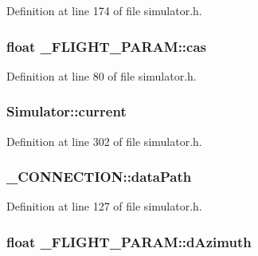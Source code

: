 \-Definition at line 174 of file simulator.\-h.

\hypertarget{group___h_i_t_l_plugin_ga2fbe36224e421144a3822791ccd78c7b}{
\subsubsection[{cas}]{\setlength{\rightskip}{0pt plus 5cm}float {\bf \-\_\-\-F\-L\-I\-G\-H\-T\-\_\-\-P\-A\-R\-A\-M\-::cas}}}\label{group___h_i_t_l_plugin_ga2fbe36224e421144a3822791ccd78c7b}


\-Definition at line 80 of file simulator.\-h.

\hypertarget{group___h_i_t_l_plugin_gaa4ad7484ddab07936a31a63fab4be22e}{
\subsubsection[{current}]{ {\bf \-Simulator\-::current}}}\label{group___h_i_t_l_plugin_gaa4ad7484ddab07936a31a63fab4be22e}


\-Definition at line 302 of file simulator.\-h.

\hypertarget{group___h_i_t_l_plugin_ga4505c573ba399fc3e915fec6842c3bcb}{
\subsubsection[{data\-Path}]{ {\bf \-\_\-\-C\-O\-N\-N\-E\-C\-T\-I\-O\-N\-::data\-Path}}}\label{group___h_i_t_l_plugin_ga4505c573ba399fc3e915fec6842c3bcb}


\-Definition at line 127 of file simulator.\-h.

\hypertarget{group___h_i_t_l_plugin_gaeb046a092ad0f1b208a0341f7e6fd520}{
\subsubsection[{d\-Azimuth}]{\setlength{\rightskip}{0pt plus 5cm}float {\bf \-\_\-\-F\-L\-I\-G\-H\-T\-\_\-\-P\-A\-R\-A\-M\-::d\-Azimuth}}}\label{group___h_i_t_l_plugin_gaeb046a092ad0f1b208a0341f7e6fd520}


